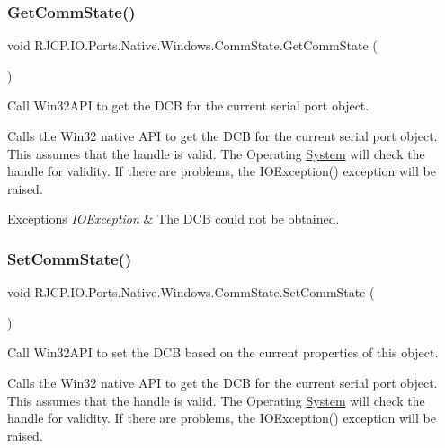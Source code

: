 \subsubsection{\texorpdfstring{GetCommState()}{GetCommState()}}
{\footnotesize\ttfamily void R\+J\+C\+P.\+I\+O.\+Ports.\+Native.\+Windows.\+Comm\+State.\+Get\+Comm\+State (\begin{DoxyParamCaption}{ }\end{DoxyParamCaption})}



Call Win32\+A\+PI to get the D\+CB for the current serial port object. 

Calls the Win32 native A\+PI to get the D\+CB for the current serial port object. This assumes that the handle is valid. The Operating \mbox{\hyperlink{namespace_system}{System}} will check the handle for validity. If there are problems, the I\+O\+Exception() exception will be raised. 


\begin{DoxyExceptions}{Exceptions}
{\em I\+O\+Exception} & The D\+CB could not be obtained.\\
\hline
\end{DoxyExceptions}
\mbox{\label{class_r_j_c_p_1_1_i_o_1_1_ports_1_1_native_1_1_windows_1_1_comm_state_a0a20f9d712c5ad860155845b1dffd56b}} 
\subsubsection{\texorpdfstring{SetCommState()}{SetCommState()}}
{\footnotesize\ttfamily void R\+J\+C\+P.\+I\+O.\+Ports.\+Native.\+Windows.\+Comm\+State.\+Set\+Comm\+State (\begin{DoxyParamCaption}{ }\end{DoxyParamCaption})}



Call Win32\+A\+PI to set the D\+CB based on the current properties of this object. 

Calls the Win32 native A\+PI to get the D\+CB for the current serial port object. This assumes that the handle is valid. The Operating \mbox{\hyperlink{namespace_system}{System}} will check the handle for validity. If there are problems, the I\+O\+Exception() exception will be raised. 


